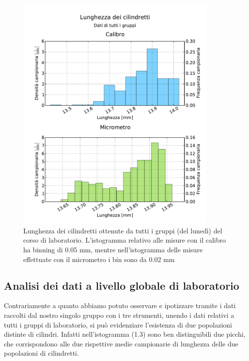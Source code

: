 \begin{figure}
	\centering
	\includegraphics[width=100mm]{grafici/cilindri_tutti_2.pdf}
    \caption{Lunghezza dei cilindretti ottenute da tutti i gruppi (del lunedì)
        del corso di laboratorio. L'istogramma relativo alle misure con il calibro
        ha binning di 0.05 mm, mentre nell'istogramma delle misure effettuate con
        il micrometro i bin sono da 0.02 mm}
\end{figure}

\subsection{Analisi dei dati a livello globale di laboratorio}
Contrariamente a quanto abbiamo potuto osservare e ipotizzare tramite i dati
raccolti dal nostro singolo gruppo con i tre strumenti, unendo i dati relativi
a tutti i gruppi di laboratorio, si può evidenziare l'esistenza di due popolazioni
distinte di cilindri. Infatti nell'istogramma (1.3) sono ben distinguibili due picchi,
che corrispondono alle due rispettive medie campionarie di lunghezza delle due
popolazioni di cilindretti.

